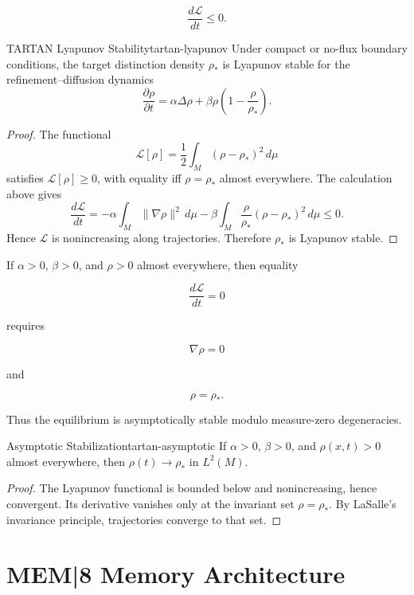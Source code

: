 \documentclass[12pt,twoside,openright]{book}
\begin{document}
\[
\frac{d\mathcal L}{dt}\le0.
\]

\begin{theorem}{TARTAN Lyapunov Stability}{tartan-lyapunov}
  Under compact or no-flux boundary conditions, the target
  distinction density \(\rho_*\) is Lyapunov stable for
  the refinement--diffusion dynamics
  \[
    \frac{\partial \rho}{\partial t}
=
    \alpha\Delta\rho
    +
    \beta\rho\left(1-\frac{\rho}{\rho_*}\right).
  \]
\end{theorem}

\begin{proof}
  The functional
  \[
    \mathcal L[\rho]
=
    \frac12
    \int_M
    (\rho-\rho_*)^2
    \,d\mu
  \]
  satisfies \(\mathcal L[\rho]\ge0\), with equality iff
  \(\rho=\rho_*\) almost everywhere. The calculation above
  gives
  \[
    \frac{d\mathcal L}{dt}
=
    -\alpha
    \int_M
    \|\nabla\rho\|^2
    \,d\mu
-
    \beta
    \int_M
    \frac{\rho}{\rho_*}
    (\rho-\rho_*)^2
    \,d\mu
    \le0.
  \]
  Hence \(\mathcal L\) is nonincreasing along trajectories.
  Therefore \(\rho_*\) is Lyapunov stable.
\end{proof}

If \(\alpha>0\), \(\beta>0\), and \(\rho>0\) almost
everywhere, then equality

\[
\frac{d\mathcal L}{dt}=0
\]

requires

\[
\nabla\rho=0
\]

and

\[
\rho=\rho_*.
\]

Thus the equilibrium is asymptotically stable modulo
measure-zero degeneracies.

\begin{corollary}{Asymptotic Stabilization}{tartan-asymptotic}
  If \(\alpha>0\), \(\beta>0\), and \(\rho(x,t)>0\) almost
  everywhere, then \(\rho(t)\to\rho_*\) in \(L^2(M)\).
\end{corollary}

\begin{proof}
  The Lyapunov functional is bounded below and
  nonincreasing, hence convergent. Its derivative vanishes
  only at the invariant set \(\rho=\rho_*\). By LaSalle's
  invariance principle, trajectories converge to that set.
\end{proof}

\section{MEM|8 Memory Architecture}
\end{document}
